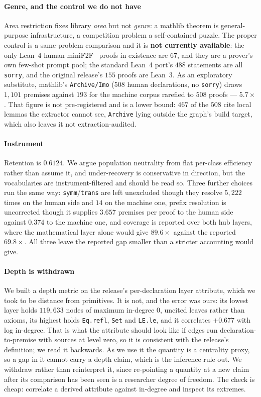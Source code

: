 \documentclass{article}
\begin{document}
\paragraph{Genre, and the control we do not have}
Area restriction fixes library \emph{area} but not \emph{genre}: a mathlib
theorem is general-purpose infrastructure, a competition problem a self-contained
puzzle. The proper control is a same-problem comparison and it is \textbf{not
currently available}: the only Lean~4 human miniF2F~\citep{minif2f} proofs in existence are $67$,
and they are a prover's own few-shot prompt pool; the standard Lean~4 port's
$488$ statements are all \texttt{sorry}, and the original release's $155$ proofs
are Lean~3. As an exploratory substitute, mathlib's \texttt{Archive/Imo} ($508$ human
declarations, no \texttt{sorry}) draws $1{,}101$ premises against $193$ for the
machine corpus rarefied to $508$ proofs --- $5.7\times$. That figure is not
pre-registered and is a lower bound: $467$ of the $508$ cite local lemmas the
extractor cannot see, \texttt{Archive} lying outside the graph's build target,
which also leaves it not extraction-audited.

\paragraph{Instrument}
Retention is $0.6124$. We argue population neutrality from flat per-class
efficiency rather than assume it, and under-recovery is conservative in
direction, but the vocabularies are instrument-filtered and should be read so.
Three further choices run the same way: \texttt{symm}/\texttt{trans} are left
unexcluded though they resolve $5{,}222$ times on the human side and $14$ on the
machine one, prefix resolution is uncorrected though it supplies $3.657$
premises per proof to the human side against $0.374$ to the machine one, and
coverage is reported over both hub layers, where the mathematical layer alone
would give $89.6\times$ against the reported $69.8\times$. All three leave the
reported gap smaller than a stricter accounting would give.

\paragraph{Depth is withdrawn}
We built a depth metric on the release's per-declaration layer attribute, which
we took to be distance from primitives. It is not, and the error was ours: its
lowest layer holds $119{,}633$ nodes of maximum in-degree $0$, uncited leaves
rather than axioms, its highest holds \texttt{Eq.refl}, \texttt{Set} and
\texttt{LE.le}, and it correlates $+0.677$ with log in-degree. That is what the attribute
should look like if edges run declaration-to-premise with sources at level zero,
so it is consistent with the release's definition; we read it backwards. As we use it the quantity is a centrality proxy,
so a gap in it cannot carry a depth claim, which is the inference
\citet{li2026network} rule out. We withdraw rather than reinterpret it, since
re-pointing a quantity at a new claim after its comparison has been seen is a
researcher degree of freedom. The check is cheap: correlate a derived
attribute against in-degree and inspect its extremes.
\end{document}
